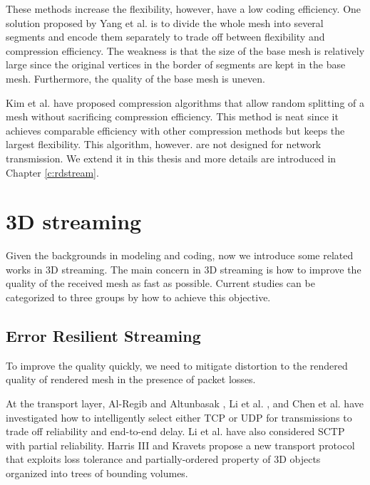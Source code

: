\documentclass[11pt, a4paper]{report}
\begin{document}
    These methods increase the flexibility, however, have a low coding efficiency.
    One solution proposed by Yang et al. \cite{progressive:Yang}
    is to divide the whole mesh into several segments and encode them
    separately to trade off between flexibility and compression efficiency.
    The weakness is that the size of the base mesh is relatively large
    since the original vertices in the border of segments are kept in the base
    mesh. Furthermore, the quality of the base mesh is uneven.

    Kim et al. \cite{multiresolution:kim}
    have proposed compression algorithms that allow random splitting of a mesh without
    sacrificing compression efficiency. This method is neat since it achieves comparable
    efficiency with other compression methods but keeps the largest flexibility.
    This algorithm, however. are not designed for 
	network transmission.  We extend it in this thesis and more details are introduced
    in Chapter \ref{c:rdstream}.  
    
    \section{3D streaming}
    \label{s:related:streaming}
    Given the backgrounds in modeling and coding, now we introduce some
    related works in 3D streaming. 
    The main concern in 3D streaming is how to improve the quality of the received
    mesh as fast as possible. Current studies can be categorized to three groups
    by how to achieve this objective.
    
    \subsection{Error Resilient Streaming}
    To improve the quality quickly, we need to mitigate distortion to the 
    rendered quality of rendered mesh in the presence of packet losses.

    At the transport layer, Al-Regib and Altunbasak \cite{3tpregib}, Li
    et al. \cite{Li2006}, and Chen et al. \cite{chen05hybrid} have
    investigated how to intelligently select either TCP or UDP for
    transmissions to trade off reliability and end-to-end delay.  Li et
    al. have also considered SCTP with partial reliability.
    Harris III and Kravets \cite{harris:design} propose a new
    transport protocol that exploits loss tolerance and
    partially-ordered property of 3D objects organized into trees of
    bounding volumes.
\end{document}
